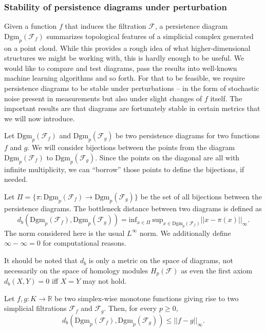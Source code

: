 \subsubsection{Stability of persistence diagrams under perturbation}
Given a function $f$ that induces the filtration $\mathcal{F}$, a persistence diagram $\text{Dgm}_{p}(\mathcal{F}_{f})$ summarizes topological features of a simplicial complex generated on a point cloud. While this provides a rough idea of what higher-dimensional structures we might be working with, this is hardly enough to be useful. We would like to compare and test diagrams, pass the results into well-known machine learning algorithms and so forth. For that to be feasible, we require persistence diagrams to be stable under perturbations -- in the form of stochastic noise present in measurements but also under slight changes of $f$ itself. The important results are that diagrams are fortunately stable in certain metrics that we will now introduce.

Let $\text{Dgm}_{p}(\mathcal{F}_{f})$ and $\text{Dgm}_{p}(\mathcal{F}_{g})$ be two persistence diagrams for two functions $f$ and $g$. We will consider bijections between the points from the diagram $\text{Dgm}_{p}(\mathcal{F}_{f})$ to $\text{Dgm}_{p}(\mathcal{F}_{g})$. Since the points on the diagonal are all with infinite multiplicity, we can ``borrow'' those points to define the bijections, if needed.

\begin{definition}
  Let $\Pi = \{\pi: \text{Dgm}_{p}(\mathcal{F}_{f}) \to \text{Dgm}_{p}(\mathcal{F}_{g})\}$ be the set of all bijections between the persistence diagrams. The bottleneck distance between two diagrams is defined as
  \begin{equation*}
    d_{b}(\text{Dgm}_{p}(\mathcal{F}_{f}), \text{Dgm}_{p}(\mathcal{F}_{g})) = \text{inf}_{x \in \Pi} \: \text{sup}_{x \in \text{Dgm}_{p}(\mathcal{F}_{f})} || x - \pi(x)||_{\infty}.
  \end{equation*}
The norm considered here is the usual $L^{\infty}$ norm. We additionally define $\infty - \infty = 0$ for computational reasons.
\end{definition}

It should be noted that $d_{b}$ is only a metric on the space of diagrams, not necessarily on the space of homology modules $H_{p}(\mathcal{F})$ as even the first axiom $d_{b}(X,Y) = 0$ iff $X = Y$ may not hold.

\begin{theorem}
  Let $f,g: K \to \mathbb{R}$ be two simplex-wise monotone functions giving rise to two simplicial filtrations $\mathcal{F}_{f}$ and $\mathcal{F}_{g}$. Then, for every $p \geq 0$,
  \begin{equation*}
    d_{b}(\text{Dgm}_{p}(\mathcal{F}_{f}), \text{Dgm}_{p}(\mathcal{F}_{g})) \leq ||f - g||_{\infty}.
  \end{equation*}

\end{theorem}
